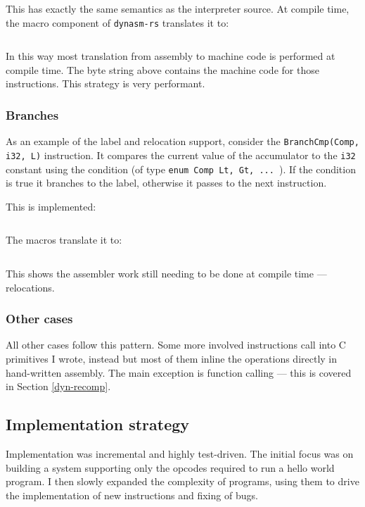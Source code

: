This has exactly the same semantics as the interpreter source. At compile time, the macro component
of \texttt{dynasm-rs} translates it to:

\inputminted{rust}{snippets/add_comp.rs}

In this way most translation from assembly to machine code is performed at compile time. The byte
string above contains the machine code for those instructions. This strategy is very performant.

\subsubsection{Branches}

As an example of the label and relocation support, consider the \texttt{BranchCmp(Comp, i32, L)}
instruction. It
compares the current value of the accumulator to the \texttt{i32} constant using the condition (of
type \texttt{enum Comp {Lt, Gt, ... }}). If the condition is true it branches to the label,
otherwise it passes to the next instruction.

This is implemented:

\inputminted{rust}{snippets/branchcmp.rs}

The macros translate it to:

\inputminted{rust}{snippets/branchcmp_comp.rs}

This shows the assembler work still needing to be done at compile time --- relocations.

\subsubsection{Other cases}

All other cases follow this pattern. Some more involved instructions call into C primitives
I wrote, instead but most of them inline the operations directly in hand-written assembly. The main
exception is function calling --- this is covered in Section \ref{dyn-recomp}.

\subsection{Implementation strategy}

Implementation was incremental and highly test-driven. The initial focus was on building a system
supporting only the opcodes required to run a hello world program. I then slowly expanded the
complexity of programs, using them to drive the implementation of new instructions and fixing of
bugs.

